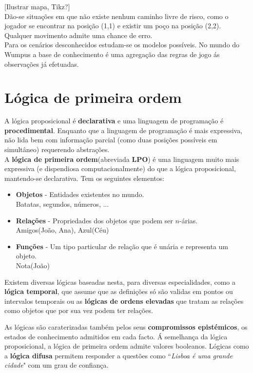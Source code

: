 \documentclass[]{report}
\begin{document}
[Ilustrar mapa, Tikz?]\\[5mm]
Dão-se situações em que não existe nenhum caminho livre de risco, como o jogador se encontrar na posição (1,1) e existir um poço na posição (2,2). Qualquer movimento admite uma chance de erro.\\
Para os cenários desconhecidos estudam-se os modelos possíveis.
No mundo do Wumpus a base de conhecimento é uma agregação das regras de jogo ás observações já efetuadas.
\section{Lógica de primeira ordem}
A lógica proposicional é \textbf{declarativa} e uma linguagem de programação é \textbf{procedimental}. Enquanto que a linguagem de programação é mais expressiva, não lida bem com informação parcial (como duas posições possíveis em simultâneo) requerendo abstrações.\\[2mm]
A \textbf{lógica de primeira ordem}(abreviada \textbf{LPO}) é uma linguagem muito mais expressiva (e dispendiosa computacionalmente) do que a lógica proposicional, mantendo-se declarativa. Tem os seguintes elementos:
\begin{itemize}
\item \textbf{Objetos} - Entidades existentes no mundo.\\
Batatas, segundos, números, ...
\item \textbf{Relações} - Propriedades dos objetos que podem ser $n$-árias.\\
Amigos(João, Ana), Azul(Céu)
\item \textbf{Funções} - Um tipo particular de relação que é unária e representa um objeto.\\
Nota(João)
\end{itemize}

Existem diversas lógicas baseadas nesta, para diversas especialidades, como a \textbf{lógica temporal}, que assume que as definições só são validas em pontos ou intervalos temporais ou as \textbf{lógicas de ordens elevadas} que tratam as relações como objetos que por sua vez podem ter relações.

As lógicas são caraterizadas também pelos seus \textbf{compromissos epistémicos}, os estados de conhecimento admitidos em cada facto. Á semelhança da lógica proposicional, a lógica de primeira ordem admite valores booleanos. Lógicas como a \textbf{lógica difusa} permitem responder a questões como ``\textit{Lisboa é uma grande cidade}" com um grau de confiança.
\end{document}
